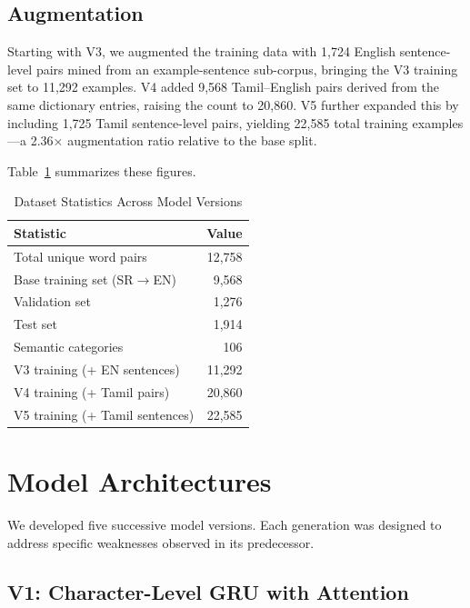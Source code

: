 \documentclass[conference]{IEEEtran}
\begin{document}
\subsection{Augmentation}

Starting with V3, we augmented the training data with 1,724 English sentence-level pairs mined from an example-sentence sub-corpus, bringing the V3 training set to 11,292 examples. V4 added 9,568 Tamil--English pairs derived from the same dictionary entries, raising the count to 20,860. V5 further expanded this by including 1,725 Tamil sentence-level pairs, yielding 22,585 total training examples---a 2.36$\times$ augmentation ratio relative to the base split.

Table~\ref{tab:dataset} summarizes these figures.

\begin{table}[htbp]
\centering
\caption{Dataset Statistics Across Model Versions}
\label{tab:dataset}
\begin{tabular}{lr}
\toprule
\textbf{Statistic} & \textbf{Value} \\
\midrule
Total unique word pairs & 12,758 \\
Base training set (SR$\rightarrow$EN) & 9,568 \\
Validation set & 1,276 \\
Test set & 1,914 \\
Semantic categories & 106 \\
\midrule
V3 training (+ EN sentences) & 11,292 \\
V4 training (+ Tamil pairs) & 20,860 \\
V5 training (+ Tamil sentences) & 22,585 \\
\bottomrule
\end{tabular}
\end{table}

\section{Model Architectures}\label{sec:models}

We developed five successive model versions. Each generation was designed to address specific weaknesses observed in its predecessor.

\subsection{V1: Character-Level GRU with Attention}
\end{document}
